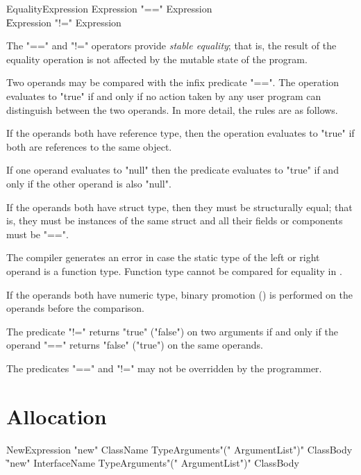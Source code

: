 \begin{grammar}
EqualityExpression \: Expression \xcd"==" Expression \\
\| Expression \xcd"!=" Expression \\
\end{grammar}

The \xcd"==" and \xcd"!=" operators provide \emph{stable
equality}; that is, the result of the equality operation is not affected
by the mutable state of the program.

Two operands may be compared with the infix predicate \xcd"==".
The operation
evaluates to \xcd"true" if and only if no action taken by any
user program can distinguish between the two operands.  In more detail,
the rules are as follows.

If the operands both have reference type, then the operation evaluates
to \xcd"true" if both are references to the same object.

If one operand evaluates to \xcd"null" then the predicate
evaluates to \xcd"true" if and only if the
other operand is also \xcd"null".

If the operands both have struct type, then they must be structurally equal;
that is, they must be instances of the same struct
and all their fields or components must be \xcd"==". 

The compiler generates an error in case the static type of the
left or right operand is a function type. Function type cannot be compared
for equality in \Xten.

If the operands both have numeric type, binary promotion
() is performed on the operands before the
comparison.

The predicate \xcd"!=" returns \xcd"true" (\xcd"false") on two
arguments if and only if the operand \xcd"==" returns \xcd"false"
(\xcd"true") on the same operands.

The predicates \xcd"==" and \xcd"!=" may not be overridden by the
programmer.

\section{Allocation}
\label{ClassCreation}

\begin{grammar}
NewExpression \: \xcd"new" ClassName TypeArguments\opt \xcd"(" ArgumentList\opt \xcd")"
        ClassBody\opt \\
  \| \xcd"new" InterfaceName TypeArguments\opt \xcd"(" ArgumentList\opt \xcd")"
        ClassBody
\end{grammar}


